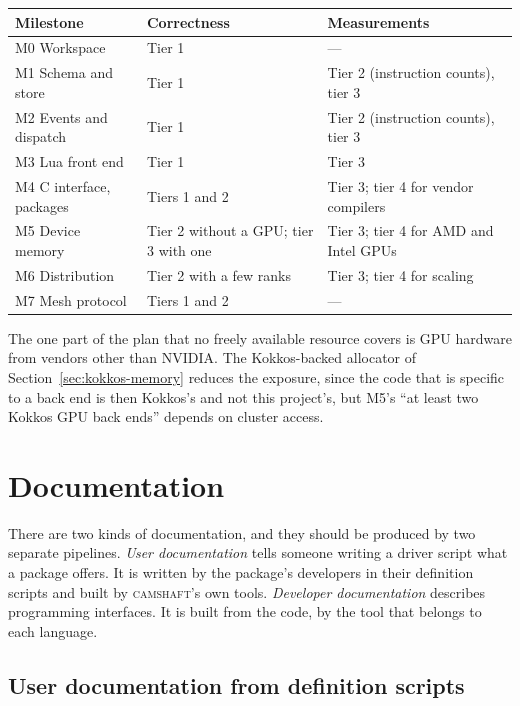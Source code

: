 \documentclass[11pt,a4paper]{article}
\newcommand{\camshaft}{\textsc{camshaft}}
\begin{document}
\begin{center}
\small
\begin{tabularx}{\textwidth}{@{}l L L@{}}
\toprule
Milestone & Correctness & Measurements \\
\midrule
M0 Workspace & Tier 1 & --- \\
M1 Schema and store & Tier 1 & Tier 2 (instruction counts), tier 3 \\
M2 Events and dispatch & Tier 1 & Tier 2 (instruction counts), tier 3 \\
M3 Lua front end & Tier 1 & Tier 3 \\
M4 C interface, packages & Tiers 1 and 2 & Tier 3; tier 4 for vendor compilers \\
M5 Device memory & Tier 2 without a GPU; tier 3 with one & Tier 3; tier 4 for AMD and Intel GPUs \\
M6 Distribution & Tier 2 with a few ranks & Tier 3; tier 4 for scaling \\
M7 Mesh protocol & Tiers 1 and 2 & --- \\
\bottomrule
\end{tabularx}
\end{center}

The one part of the plan that no freely available resource covers is GPU
hardware from vendors other than NVIDIA.  The Kokkos-backed allocator of
Section~\ref{sec:kokkos-memory} reduces the exposure, since the code that is
specific to a back end is then Kokkos's and not this project's, but M5's
\enquote{at least two Kokkos GPU back ends} depends on cluster access.

\section{Documentation}
\label{sec:docs}

There are two kinds of documentation, and they should be produced by two
separate pipelines.  \emph{User documentation} tells someone writing a
driver script what a package offers.  It is written by the package's
developers in their definition scripts and built by \camshaft{}'s own tools.
\emph{Developer documentation} describes programming interfaces.  It is
built from the code, by the tool that belongs to each language.

\subsection{User documentation from definition scripts}
\end{document}
